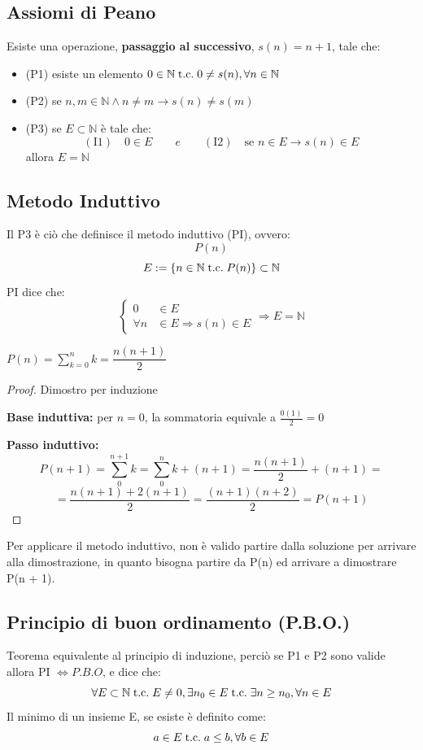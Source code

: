\documentclass[a4paper, 12pt, openany]{book}
\begin{document}
	\subsection{Assiomi di Peano}
	Esiste una operazione, \textbf{passaggio al successivo}, $s(n) = n + 1$, tale che:
	\begin{itemize}
		\item (P1) esiste un elemento $0 \in \mathbb{N} \;\text{t.c.}\; 0 \not = s(n), \forall n \in \mathbb{N}$
		\item (P2) se $n,m \in \mathbb{N} \wedge n \not = m \rightarrow s(n) \not = s(m)$
		\item (P3) se $E \subset \mathbb{N}$ è tale che:
		\[ (\text{I1})\quad 0 \in E \quad \quad e \quad \quad (\text{I2})\quad \text{se } n \in E \rightarrow s(n) \in E\]
		allora $E = \mathbb{N}$
	\end{itemize}
	
	\subsection{Metodo Induttivo}
	Il P3 è ciò che definisce il metodo induttivo (PI), ovvero:
	\[P(n)\]
	\[E := \{n \in \mathbb{N} \;\text{t.c.}\; P(n)\} \subset \mathbb{N}\]
	PI dice che:
	\[
	\left\{
	\begin{aligned}
		0 &\in E \\
		\forall n &\in E \Rightarrow s(n) \in E
	\end{aligned}\right. \Rightarrow E = \mathbb{N}\]
	
	\begin{proposition}
		$\displaystyle P(n) = \sum_{k=0}^{n} k = \dfrac{n(n+1)}{2}$
	\end{proposition}
	
	\begin{proof}
		Dimostro per induzione
		
		\textbf{Base induttiva:} per \(n = 0\), la sommatoria equivale a \(\frac{0(1)}{2} = 0\)
		
		\textbf{Passo induttivo:} 
		\[P(n + 1) = \sum_{0}^{n + 1} k = \sum_{0}^{n} k + (n + 1) = \frac{n(n+1)}{2} + (n + 1) =\]
		\[= \frac{n(n+1) + 2(n+1)}{2} = \frac{(n+1)(n + 2)}{2} = P(n + 1)\] 
	\end{proof}
	
	Per applicare il metodo induttivo, non è valido partire dalla soluzione per arrivare alla dimostrazione, in quanto bisogna partire da P(n) ed arrivare a dimostrare P(n + 1).
	
	\subsection{Principio di buon ordinamento (P.B.O.)}
	Teorema equivalente al principio di induzione, perciò se P1 e P2 sono valide allora PI $\iff P.B.O$, e dice che:
	\[\forall E \subset \mathbb{N} \;\text{t.c.}\; E \not = 0, \exists n_0 \in E \;\text{t.c.}\; \exists n \geq n_0, \forall n \in E\]
	Il minimo di un insieme E, se esiste è definito come:
	\[a\in E \;\text{t.c.}\; a \leq b, \forall b \in E\]
	
\end{document}
